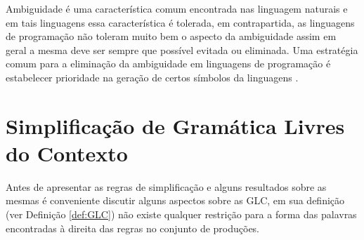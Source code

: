 Ambiguidade é uma característica comum encontrada nas linguagem naturais \cite{benjaLivro2010} e em tais linguagens essa característica é tolerada, em contrapartida, as linguagens de programação não toleram muito bem o aspecto da ambiguidade assim em geral a mesma deve ser sempre que possível evitada ou eliminada. Uma estratégia comum para a eliminação da ambiguidade em linguagens de programação é estabelecer prioridade na geração de certos símbolos da linguagens \cite{benjaLivro2010, aho2007}. 

\section{Simplificação de Gramática Livres do Contexto}\label{sec:SimplficacaoGLC}

Antes de apresentar as regras de simplificação e alguns resultados sobre as mesmas é conveniente discutir alguns aspectos sobre as GLC, em sua definição (ver Definição \ref{def:GLC}) não existe qualquer restrição para a forma das palavras encontradas à direita das regras no conjunto de produções.